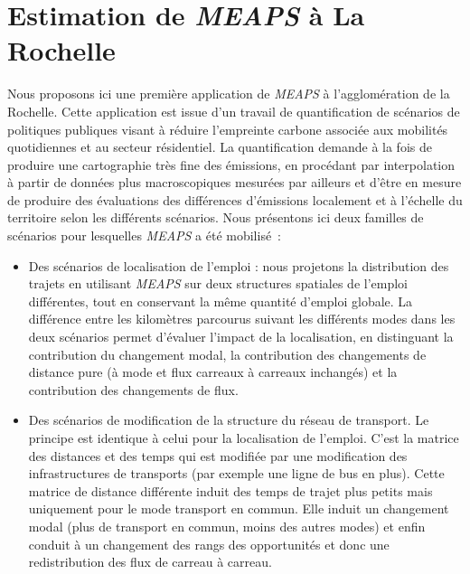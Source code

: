 \documentclass[
  10pt,
  a4paper,
  numbers=noendperiod,
  DIV=9]{scrreprt}
\begin{document}

\hypertarget{sec-rochelle}{%
\chapter{\texorpdfstring{Estimation de \emph{MEAPS} à La
Rochelle}{Estimation de MEAPS à La Rochelle}}\label{sec-rochelle}}

Nous proposons ici une première application de \emph{MEAPS} à
l'agglomération de la Rochelle. Cette application est issue d'un travail
de quantification de scénarios de politiques publiques visant à réduire
l'empreinte carbone associée aux mobilités quotidiennes et au secteur
résidentiel. La quantification demande à la fois de produire une
cartographie très fine des émissions, en procédant par interpolation à
partir de données plus macroscopiques mesurées par ailleurs et d'être en
mesure de produire des évaluations des différences d'émissions
localement et à l'échelle du territoire selon les différents scénarios.
Nous présentons ici deux familles de scénarios pour lesquelles
\emph{MEAPS} a été mobilisé~:

\begin{itemize}
\item
  Des scénarios de localisation de l'emploi : nous projetons la
  distribution des trajets en utilisant \emph{MEAPS} sur deux structures
  spatiales de l'emploi différentes, tout en conservant la même quantité
  d'emploi globale. La différence entre les kilomètres parcourus suivant
  les différents modes dans les deux scénarios permet d'évaluer l'impact
  de la localisation, en distinguant la contribution du changement
  modal, la contribution des changements de distance pure (à mode et
  flux carreaux à carreaux inchangés) et la contribution des changements
  de flux.
\item
  Des scénarios de modification de la structure du réseau de transport.
  Le principe est identique à celui pour la localisation de l'emploi.
  C'est la matrice des distances et des temps qui est modifiée par une
  modification des infrastructures de transports (par exemple une ligne
  de bus en plus). Cette matrice de distance différente induit des temps
  de trajet plus petits mais uniquement pour le mode transport en
  commun. Elle induit un changement modal (plus de transport en commun,
  moins des autres modes) et enfin conduit à un changement des rangs des
  opportunités et donc une redistribution des flux de carreau à carreau.
\end{itemize}
\end{document}

